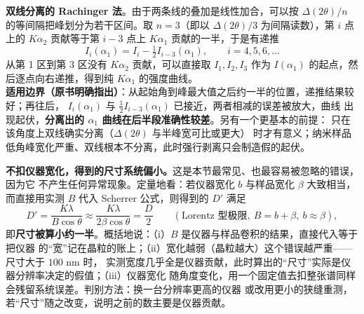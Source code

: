 \begin{measure}
\textbf{双线分离的 Rachinger 法}。由于两条线的叠加是线性加合，可以按 $\Delta(2\theta)/n$
的等间隔把峰划分为若干区间。取 $n=3$（即以 $\Delta(2\theta)/3$ 为间隔读数），第 $i$ 点上的
$K\alpha_{2}$ 贡献等于第 $i-3$ 点上 $K\alpha_{1}$ 贡献的一半，于是有递推
\begin{equation}
I_{i}(\alpha_{1})=I_{i}-\tfrac{1}{2}I_{i-3}(\alpha_{1}),
\qquad i=4,5,6,\dots
\label{eq:ch04c-rachinger}
\end{equation}
从第 1 区到第 3 区没有 $K\alpha_{2}$ 贡献，可以直接取 $I_{1},I_{2},I_{3}$ 作为
$I(\alpha_{1})$ 的起点，然后逐点向右递推，得到纯 $K\alpha_{1}$ 的强度曲线。\\
\textbf{适用边界（原书明确指出）}：从起始角到峰最大值之后约一半的位置，递推结果较好；再往后，
$I_{i}(\alpha_{1})$ 与 $\tfrac{1}{2}I_{i-3}(\alpha_{1})$ 已接近，两者相减的误差被放大，曲线
出现起伏，\textbf{分离出的 $\alpha_{1}$ 曲线在后半段准确性较差}。另有一个更基本的前提：
 只在该角度上双线确实分离（$\Delta(2\theta)$ 与半峰宽可比或更大）
时才有意义；纳米样品低角峰宽化严重、双线根本不分离，此时强行剥离只会制造假的起伏。
\end{measure}

\begin{pitfall}
\textbf{不扣仪器宽化，得到的尺寸系统偏小。}这是本节最常见、也最容易被忽略的错误，因为它
不产生任何异常现象。定量地看：若仪器宽化 $b$ 与样品宽化 $\beta$ 大致相当，而直接用实测 $B$
代入 Scherrer 公式，则得到的 $D'$ 满足
\begin{equation}
D'=\frac{K\lambda}{B\cos\theta}\approx\frac{K\lambda}{2\beta\cos\theta}=\frac{D}{2}
\qquad(\text{Lorentz 型极限},\ B=b+\beta,\ b\approx\beta),
\label{eq:ch04c-halving}
\end{equation}
即\textbf{尺寸被算小约一半}。概括地说：（i）$B$ 是仪器与样品卷积的结果，直接代入等于把仪器
的``宽''记在晶粒的账上；（ii）宽化越弱（晶粒越大）这个错误越严重——尺寸大于 $100$ nm 时，
实测宽度几乎全是仪器贡献，此时算出的``尺寸''实际是仪器分辨率决定的假值；（iii）仪器宽化
随角度变化，用一个固定值去扣整张谱同样会残留系统误差。判别方法：换一台分辨率更高的仪器
或改用更小的狭缝重测，若``尺寸''随之改变，说明之前的数主要是仪器贡献。
\end{pitfall}


